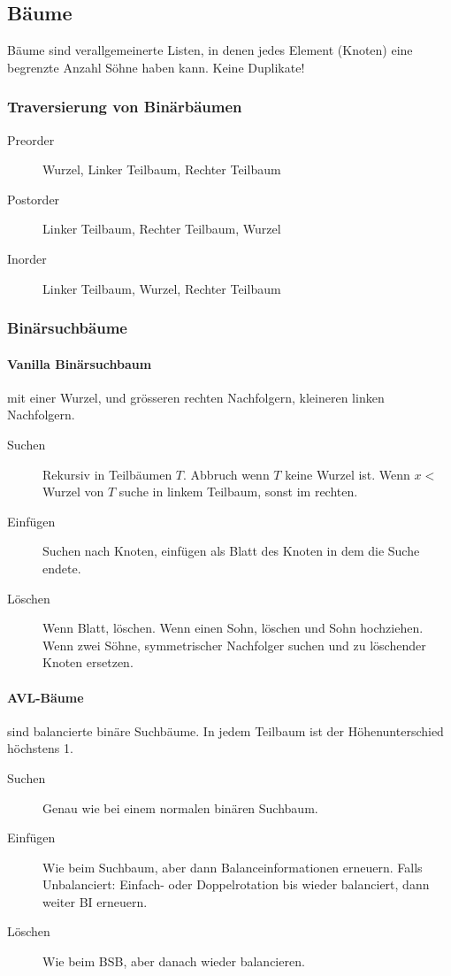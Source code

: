 \documentclass[a4paper, 9pt, DIV=20]{scrartcl}
\begin{document}
\subsection{Bäume}
Bäume sind verallgemeinerte Listen, in denen jedes Element (Knoten) eine begrenzte Anzahl Söhne haben kann. Keine Duplikate! 

\subsubsection{Traversierung von Binärbäumen}
\begin{description}
\item[Preorder] Wurzel, Linker Teilbaum, Rechter Teilbaum
\item[Postorder] Linker Teilbaum, Rechter Teilbaum, Wurzel
\item[Inorder] Linker Teilbaum, Wurzel, Rechter Teilbaum
\end{description}

\subsubsection{Binärsuchbäume}

\paragraph{Vanilla Binärsuchbaum} mit einer Wurzel, und grösseren rechten Nachfolgern, kleineren linken Nachfolgern.
\begin{description}
\item[Suchen] Rekursiv in Teilbäumen $T$. Abbruch wenn $T$ keine Wurzel ist. Wenn $x <$ Wurzel von $T$ suche in linkem Teilbaum, sonst im rechten.
\item[Einfügen] Suchen nach Knoten, einfügen als Blatt des Knoten in dem die Suche endete.
\item[Löschen] Wenn Blatt, löschen. Wenn einen Sohn, löschen und Sohn hochziehen. Wenn zwei Söhne, symmetrischer Nachfolger suchen und zu löschender Knoten ersetzen.
\end{description}
\paragraph{AVL-Bäume} sind balancierte binäre Suchbäume. In jedem Teilbaum ist der Höhenunterschied höchstens 1.
\begin{description}
\item[Suchen] Genau wie bei einem normalen binären Suchbaum.
\item[Einfügen] Wie beim Suchbaum, aber dann Balanceinformationen erneuern. Falls Unbalanciert: Einfach- oder Doppelrotation bis wieder balanciert, dann weiter BI erneuern.
\item[Löschen] Wie beim BSB, aber danach wieder balancieren.
\end{description}
\end{document}
